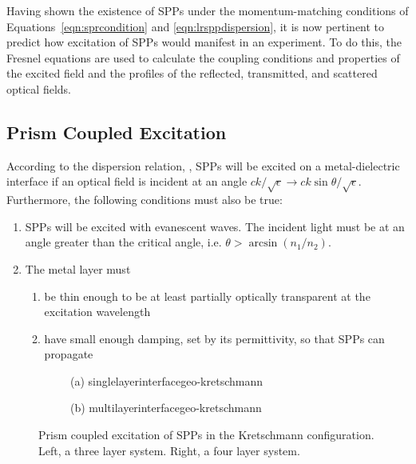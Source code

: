 Having shown the existence of SPPs under the momentum-matching conditions
of Equations~\ref{eqn:sprcondition} and \ref{eqn:lrsppdispersion}, it is
now pertinent to predict how excitation of SPPs would manifest in an
experiment.  To do this, the Fresnel equations are used to calculate the
coupling conditions and properties of the excited field and the profiles of
the reflected, transmitted, and scattered optical fields.  


\subsection{Prism Coupled Excitation}
According to the dispersion relation, , 
SPPs will be excited on a
metal-dielectric interface if an optical field is incident at an angle 
$ck/\sqrt{\epsilon} \to ck\sin\theta/\sqrt{\epsilon}$.  Furthermore, the following
conditions must also be true:
\begin{enumerate}
\item SPPs will be excited with evanescent waves.  The
incident light must be at an angle greater than the critical angle, i.e.
$\theta>\arcsin\left(n_1/n_2\right)$.
\item The metal layer must
\begin{enumerate}
\item be thin enough to be at least partially optically transparent at the excitation wavelength
\item have small enough damping, set by its permittivity, so that SPPs can propagate
\end{enumerate}
\end{enumerate}

\begin{figure}[ht]
 \centering
 \begin{subfigure}[b]{0.4\textwidth}
  \centering(a)
  {singlelayerinterfacegeo-kretschmann}
 \end{subfigure}
 \begin{subfigure}[b]{0.4\textwidth}
  \centering(b)
  {multilayerinterfacegeo-kretschmann}
 \end{subfigure}
\caption{Prism coupled excitation of SPPs in the Kretschmann configuration.
								Left, a three layer system.  Right, a four layer system. }
\label{fig:prismcoupledsetups}
\end{figure}

